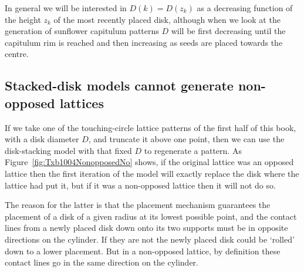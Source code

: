 In general we will be interested in $D(k)=D(z_k)$ as a decreasing function of the height $z_k$ of the most recently placed disk, although when we look at the generation of sunflower capitulum patterns $D$ will be first decreasing until the capitulum rim is reached and then increasing as seeds are placed towards the centre. 

\subsection{Stacked-disk models cannot generate non-opposed lattices}
If we take one of the touching-circle lattice patterns of the first half of this book, with a disk diameter $D$, and truncate it above one point, then
we can use the disk-stacking model with that fixed $D$ to regenerate a pattern. As Figure~\ref{fig:Txb1004NonopposedNo} shows, if the original lattice was an opposed lattice then the first iteration of the model will exactly replace the disk where the lattice had put it, but if it was a non-opposed lattice then it will not do so.


The reason for the latter is that the placement mechanism guarantees the placement of a disk of a given radius at its lowest possible point, and the contact lines from a newly placed disk down onto its two supports must be in opposite directions on the cylinder. If they are not the newly placed disk could be `rolled' down to a lower placement. But in a non-opposed lattice, by definition these contact lines go in the same direction on the cylinder.


